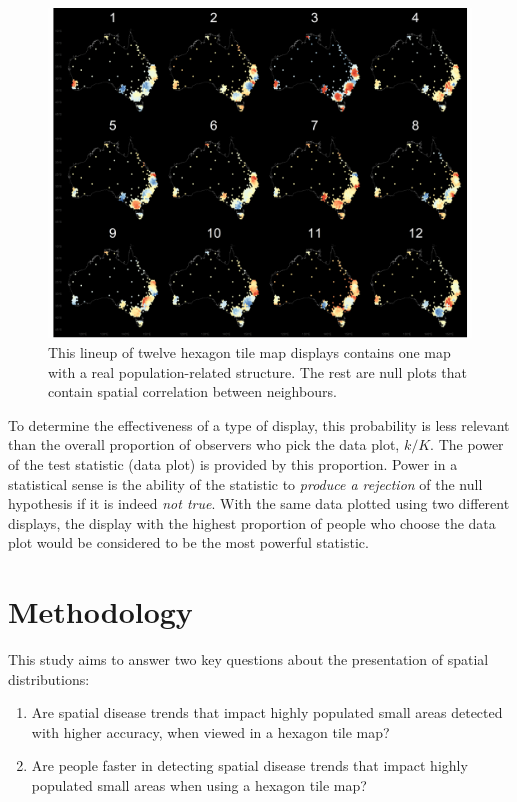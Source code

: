 \documentclass[times, doublespace]{anzsauth}
\begin{document}
\begin{figure}
\includegraphics[width=1\linewidth]{paper_files/figure-latex/lineup-1} \caption{This lineup of twelve hexagon tile map displays contains one map with a real population-related structure. The rest are null plots that contain spatial correlation between neighbours.}\label{fig:lineup}
\end{figure}

To determine the effectiveness of a type of display, this
probability is less relevant than the overall proportion of observers
who pick the data plot, \(k/K\). The power of the test statistic (data
plot) is provided by this proportion. Power in a statistical sense is
the ability of the statistic to \emph{produce a rejection} of the null
hypothesis if it is indeed \emph{not true}. With the same data plotted
using two different displays, the display with the highest proportion of
people who choose the data plot would be considered to be the most
powerful statistic.

\section{Methodology}\label{methodology}

This study aims to answer two key questions about the presentation of
spatial distributions:

\begin{enumerate}
\def\labelenumi{\arabic{enumi}.}
 \item
  Are spatial disease trends that impact highly populated small areas
  detected with higher accuracy, when viewed in a hexagon tile map?
\item
  Are people faster in detecting spatial disease trends that impact
  highly populated small areas when using a hexagon tile map?
\end{enumerate}
\end{document}
